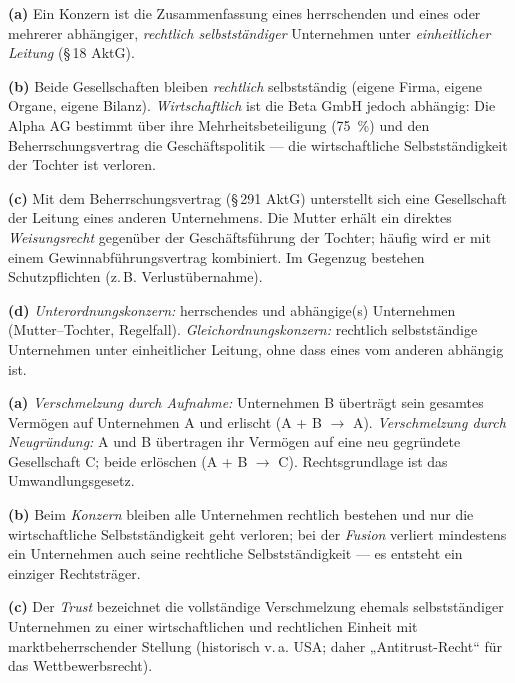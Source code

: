 \documentclass[11pt, a4paper]{article}
\begin{document}
\begin{loesung}[title={Lösung Aufgabe~5 --- Konzern}]
\textbf{(a)} Ein Konzern ist die Zusammenfassung eines herrschenden und eines oder
mehrerer abhängiger, \emph{rechtlich selbstständiger} Unternehmen unter
\emph{einheitlicher Leitung} (\S\,18 AktG).

\textbf{(b)} Beide Gesellschaften bleiben \emph{rechtlich} selbstständig (eigene Firma,
eigene Organe, eigene Bilanz). \emph{Wirtschaftlich} ist die Beta GmbH jedoch abhängig:
Die Alpha AG bestimmt über ihre Mehrheitsbeteiligung (75~\%) und den Beherrschungsvertrag
die Geschäftspolitik --- die wirtschaftliche Selbstständigkeit der Tochter ist verloren.

\textbf{(c)} Mit dem Beherrschungsvertrag (\S\,291 AktG) unterstellt sich eine
Gesellschaft der Leitung eines anderen Unternehmens. Die Mutter erhält ein direktes
\emph{Weisungsrecht} gegenüber der Geschäftsführung der Tochter; häufig wird er mit einem
Gewinnabführungsvertrag kombiniert. Im Gegenzug bestehen Schutzpflichten (z.\,B.
Verlustübernahme).

\textbf{(d)} \emph{Unterordnungskonzern:} herrschendes und abhängige(s) Unternehmen
(Mutter--Tochter, Regelfall). \emph{Gleichordnungskonzern:} rechtlich selbstständige
Unternehmen unter einheitlicher Leitung, ohne dass eines vom anderen abhängig ist.
\end{loesung}

\begin{loesung}[title={Lösung Aufgabe~6 --- Fusion und Trust}]
\textbf{(a)} \emph{Verschmelzung durch Aufnahme:} Unternehmen B überträgt sein gesamtes
Vermögen auf Unternehmen A und erlischt (A + B $\rightarrow$ A).
\emph{Verschmelzung durch Neugründung:} A und B übertragen ihr Vermögen auf eine neu
gegründete Gesellschaft C; beide erlöschen (A + B $\rightarrow$ C). Rechtsgrundlage ist
das Umwandlungsgesetz.

\textbf{(b)} Beim \emph{Konzern} bleiben alle Unternehmen rechtlich bestehen und nur die
wirtschaftliche Selbstständigkeit geht verloren; bei der \emph{Fusion} verliert
mindestens ein Unternehmen auch seine rechtliche Selbstständigkeit --- es entsteht ein
einziger Rechtsträger.

\textbf{(c)} Der \emph{Trust} bezeichnet die vollständige Verschmelzung ehemals
selbstständiger Unternehmen zu einer wirtschaftlichen und rechtlichen Einheit mit
marktbeherrschender Stellung (historisch v.\,a. USA; daher „Antitrust-Recht`` für das
Wettbewerbsrecht).
\end{loesung}
\end{document}
